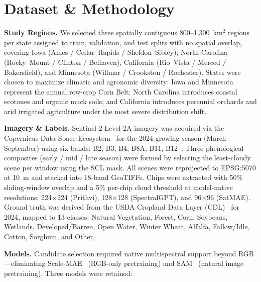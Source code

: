 \documentclass[sigconf, nonacm]{acmart}
\begin{document}
\section{Dataset \& Methodology}

\textbf{Study Regions.}
We selected three spatially contiguous 800--1{,}300~km$^{2}$
regions per state assigned to train, validation, and test
splits with no spatial overlap, covering Iowa (Ames /
Cedar~Rapids / Sheldon--Sibley), North Carolina
(Rocky~Mount / Clinton / Belhaven), California
(Rio~Vista / Merced / Bakersfield), and Minnesota
(Willmar / Crookston / Rochester). States were chosen to
maximize climatic and agronomic diversity: Iowa and Minnesota
represent the annual row-crop Corn Belt; North Carolina
introduces coastal ecotones and organic muck soils; and
California introduces perennial orchards and arid irrigated
agriculture under the most severe distribution shift.

\textbf{Imagery \& Labels.}
Sentinel-2 Level-2A imagery was acquired via the Copernicus
Data Space Ecosystem~\cite{cdse_annual_report} for the 2024
growing season (March--September) using six bands: B2, B3,
B4, B8A, B11, B12~\cite{sentinel2_bands}. Three phenological
composites (early / mid / late season) were formed by
selecting the least-cloudy scene per window using the SCL
mask. All scenes were reprojected to EPSG:5070 at 10~m and
stacked into 18-band GeoTIFFs. Chips were extracted with
50\% sliding-window overlap and a 5\% per-chip cloud
threshold at model-native resolutions: 224$\times$224
(Prithvi), 128$\times$128 (SpectralGPT), and 96$\times$96
(SatMAE). Ground truth was derived from the USDA Cropland
Data Layer (CDL)~\cite{usda_cdl} for 2024, mapped to 13
classes: Natural Vegetation, Forest, Corn, Soybeans,
Wetlands, Developed/Barren, Open Water, Winter Wheat,
Alfalfa, Fallow/Idle, Cotton, Sorghum, and Other.

\textbf{Models.}
Candidate selection required native multispectral support
beyond RGB---eliminating Scale-MAE~\cite{reed2023scale}
(RGB-only pretraining) and SAM~\cite{osco2023segment}
(natural image pretraining). Three models were retained:
\end{document}
